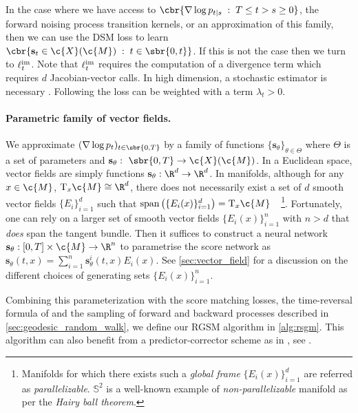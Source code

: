 In the case where we have access to $\cbr{\nabla \log p_{t|s}\;:\;T \le t > s \ge 0}$, the forward noising process transition kernels, or an approximation of this family, then we can use the DSM loss to learn $\cbr{\mathbf{s}_t \in \c{X}(\c{M}) \;:\;t \in \sbr{0,t}}$.
If this is not the case then we turn to $\ell^{\textup{im}}_t$.
Note that $\ell^{\textup{im}}_t$ requires the computation of a divergence term which requires $d$ Jacobian-vector calls.
In high dimension, a stochastic estimator is necessary \parencite{hutchinson1989stochastic}.
Following \textcite{song2020improved, nichol2021improved} the loss can be weighted with a term $\lambda_t > 0$.

\paragraph{Parametric family of vector fields.}
We approximate $(\nabla \log p_t)_{t \in \sbr{0,T}}$ by a family of functions $\{\mathbf{s}_\theta\}_{\theta \in \Theta}$ where $\Theta$ is a set of parameters and $\mathbf{s}_\theta: \ \sbr{0,T} \to \c{X}(\c{M})$.
In a Euclidean space, vector fields are simply functions $\mathbf{s}_\theta: \R^d \rightarrow \R^d$.
In manifolds, although for any $x \in \c{M}$, $\mathrm{T}_x\c{M} \cong \R^d$, there does not necessarily exist a set of $d$ smooth vector fields $\{E_i\}_{i=1}^d$ such that $\text{span}\left( \{E_i(x)\}_{i=1}^d \right) = \mathrm{T}_x\c{M}$~\parencite[Chapter 8, page 179,][]{lee2006riemannian}~\footnote{Manifolds for which there exists such a \emph{global frame} $\{E_i(x)\}_{i=1}^d$ are referred as \emph{parallelizable}.
$\mathbb{S}^2$ is a well-known example of
\emph{non-parallelizable} manifold as per the \emph{Hairy ball theorem}.}.
Fortunately, one can rely on a larger set of smooth vector fields $\{E_i(x)\}_{i=1}^n$ with $n > d$ that \emph{does} span the tangent bundle.
Then it suffices to construct a neural network $\mathbf{s}_\theta: [0, T] \times \c{M} \rightarrow \R^n$ to parametrise the score network as $\mathbf{s}_\theta(t,x) = \sum_{i=1}^n \mathbf{s}^i_\theta(t,x) E_i(x)$.
See \cref{sec:vector_field} for a discussion on the different choices of generating sets $\{E_i(x)\}_{i=1}^n$.

Combining this parameterization with the score matching losses, the time-reversal formula of  and the sampling of forward and backward processes described in \cref{sec:geodesic_random_walk}, we define our RGSM algorithm in \cref{alg:rsgm}.
This algorithm can also benefit from a predictor-corrector scheme as in \textcite{song2020score}, see .

